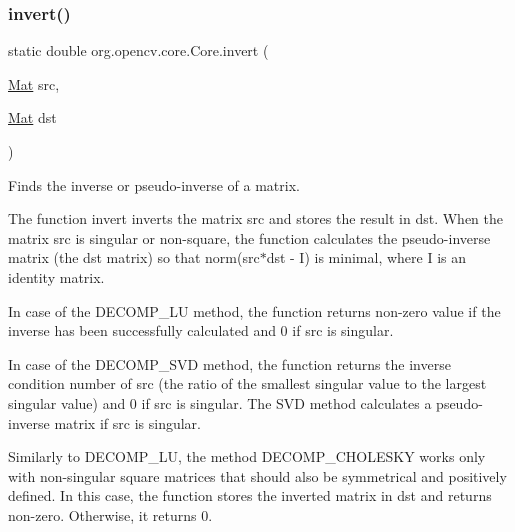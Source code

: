 \subsubsection{\texorpdfstring{invert()}{invert()}\hspace{0.1cm}{\footnotesize\ttfamily [2/2]}}
{\footnotesize\ttfamily static double org.\+opencv.\+core.\+Core.\+invert (\begin{DoxyParamCaption}\item[{\mbox{\hyperlink{classorg_1_1opencv_1_1core_1_1_mat}{Mat}}}]{src,  }\item[{\mbox{\hyperlink{classorg_1_1opencv_1_1core_1_1_mat}{Mat}}}]{dst }\end{DoxyParamCaption})\hspace{0.3cm}{\ttfamily [static]}}

Finds the inverse or pseudo-\/inverse of a matrix.

The function {\ttfamily invert} inverts the matrix {\ttfamily src} and stores the result in {\ttfamily dst}. When the matrix {\ttfamily src} is singular or non-\/square, the function calculates the pseudo-\/inverse matrix (the {\ttfamily dst} matrix) so that {\ttfamily norm(src$\ast$dst -\/ I)} is minimal, where I is an identity matrix.

In case of the {\ttfamily D\+E\+C\+O\+M\+P\+\_\+\+LU} method, the function returns non-\/zero value if the inverse has been successfully calculated and 0 if {\ttfamily src} is singular.

In case of the {\ttfamily D\+E\+C\+O\+M\+P\+\_\+\+S\+VD} method, the function returns the inverse condition number of {\ttfamily src} (the ratio of the smallest singular value to the largest singular value) and 0 if {\ttfamily src} is singular. The S\+VD method calculates a pseudo-\/inverse matrix if {\ttfamily src} is singular.

Similarly to {\ttfamily D\+E\+C\+O\+M\+P\+\_\+\+LU}, the method {\ttfamily D\+E\+C\+O\+M\+P\+\_\+\+C\+H\+O\+L\+E\+S\+KY} works only with non-\/singular square matrices that should also be symmetrical and positively defined. In this case, the function stores the inverted matrix in {\ttfamily dst} and returns non-\/zero. Otherwise, it returns 0.


